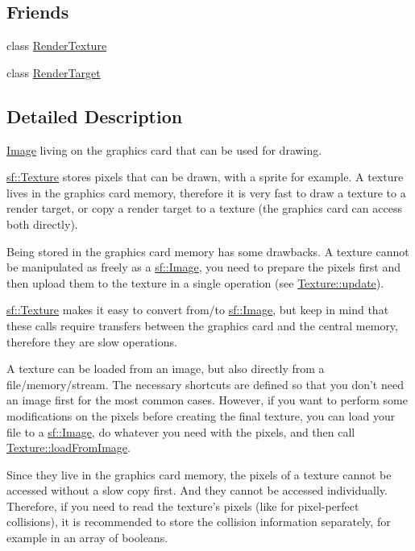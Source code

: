 \subsection*{Friends}
\begin{DoxyCompactItemize}
\item 
class \hyperlink{classsf_1_1_texture_a96c222b24c6d9ddbc3666f7981622156}{Render\-Texture}
\item 
class \hyperlink{classsf_1_1_texture_a564c389faf3e8638c546c12cdbdda81d}{Render\-Target}
\end{DoxyCompactItemize}


\subsection{Detailed Description}
\hyperlink{classsf_1_1_image}{Image} living on the graphics card that can be used for drawing. 

\hyperlink{classsf_1_1_texture}{sf\-::\-Texture} stores pixels that can be drawn, with a sprite for example. A texture lives in the graphics card memory, therefore it is very fast to draw a texture to a render target, or copy a render target to a texture (the graphics card can access both directly).

Being stored in the graphics card memory has some drawbacks. A texture cannot be manipulated as freely as a \hyperlink{classsf_1_1_image}{sf\-::\-Image}, you need to prepare the pixels first and then upload them to the texture in a single operation (see \hyperlink{classsf_1_1_texture_ae4eab5c6781316840b0c50ad08370963}{Texture\-::update}).

\hyperlink{classsf_1_1_texture}{sf\-::\-Texture} makes it easy to convert from/to \hyperlink{classsf_1_1_image}{sf\-::\-Image}, but keep in mind that these calls require transfers between the graphics card and the central memory, therefore they are slow operations.

A texture can be loaded from an image, but also directly from a file/memory/stream. The necessary shortcuts are defined so that you don't need an image first for the most common cases. However, if you want to perform some modifications on the pixels before creating the final texture, you can load your file to a \hyperlink{classsf_1_1_image}{sf\-::\-Image}, do whatever you need with the pixels, and then call \hyperlink{classsf_1_1_texture_abec4567ad9856a3596dc74803f26fba2}{Texture\-::load\-From\-Image}.

Since they live in the graphics card memory, the pixels of a texture cannot be accessed without a slow copy first. And they cannot be accessed individually. Therefore, if you need to read the texture's pixels (like for pixel-\/perfect collisions), it is recommended to store the collision information separately, for example in an array of booleans.

